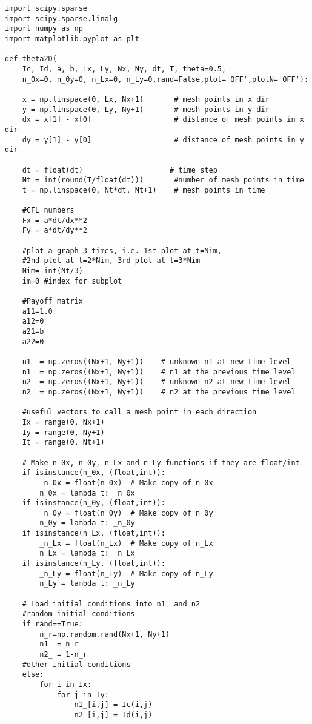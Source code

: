 \begin{lstlisting}
import scipy.sparse
import scipy.sparse.linalg
import numpy as np
import matplotlib.pyplot as plt

def theta2D(
    Ic, Id, a, b, Lx, Ly, Nx, Ny, dt, T, theta=0.5,
    n_0x=0, n_0y=0, n_Lx=0, n_Ly=0,rand=False,plot='OFF',plotN='OFF'):
    
    x = np.linspace(0, Lx, Nx+1)       # mesh points in x dir
    y = np.linspace(0, Ly, Ny+1)       # mesh points in y dir
    dx = x[1] - x[0]                   # distance of mesh points in x dir 
    dy = y[1] - y[0]                   # distance of mesh points in y dir 

    dt = float(dt)   				  # time step
    Nt = int(round(T/float(dt)))       #number of mesh points in time
    t = np.linspace(0, Nt*dt, Nt+1)    # mesh points in time

    #CFL numbers
    Fx = a*dt/dx**2
    Fy = a*dt/dy**2
    
    #plot a graph 3 times, i.e. 1st plot at t=Nim, 
	#2nd plot at t=2*Nim, 3rd plot at t=3*Nim
    Nim= int(Nt/3)
    im=0 #index for subplot
    
    #Payoff matrix
    a11=1.0
    a12=0
    a21=b
    a22=0   
        
    n1  = np.zeros((Nx+1, Ny+1))    # unknown n1 at new time level
    n1_ = np.zeros((Nx+1, Ny+1))    # n1 at the previous time level
    n2  = np.zeros((Nx+1, Ny+1))    # unknown n2 at new time level
    n2_ = np.zeros((Nx+1, Ny+1))    # n2 at the previous time level
    
    #useful vectors to call a mesh point in each direction
    Ix = range(0, Nx+1)
    Iy = range(0, Ny+1)
    It = range(0, Nt+1)

    # Make n_0x, n_0y, n_Lx and n_Ly functions if they are float/int
    if isinstance(n_0x, (float,int)):
        _n_0x = float(n_0x)  # Make copy of n_0x
        n_0x = lambda t: _n_0x
    if isinstance(n_0y, (float,int)):
        _n_0y = float(n_0y)  # Make copy of n_0y
        n_0y = lambda t: _n_0y
    if isinstance(n_Lx, (float,int)):
        _n_Lx = float(n_Lx)  # Make copy of n_Lx
        n_Lx = lambda t: _n_Lx
    if isinstance(n_Ly, (float,int)):
        _n_Ly = float(n_Ly)  # Make copy of n_Ly
        n_Ly = lambda t: _n_Ly

    # Load initial conditions into n1_ and n2_
    #random initial conditions
    if rand==True:
        n_r=np.random.rand(Nx+1, Ny+1)
        n1_ = n_r
        n2_ = 1-n_r
    #other initial conditions
    else:
        for i in Ix:
            for j in Iy:
                n1_[i,j] = Ic(i,j)
                n2_[i,j] = Id(i,j)
        

\end{lstlisting}
